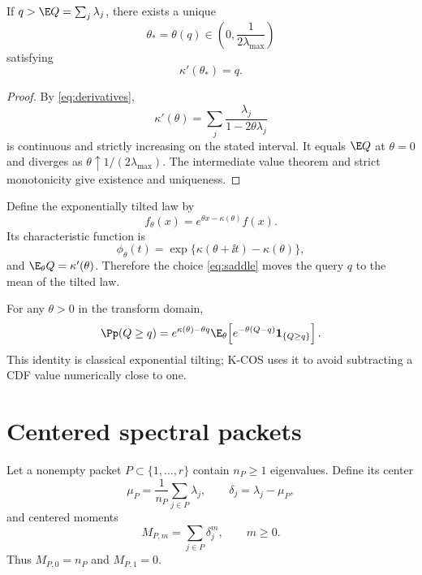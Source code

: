 \begin{theorem}
\label{thm:saddle}
If $q>\E Q=\sum_j\lambda_j$, there exists a unique
\[
\theta_*=\theta(q)\in\left(0,\frac{1}{2\lambda_{\max}}\right)
\]
satisfying
\begin{equation}
\kappa'(\theta_*)=q.
\label{eq:saddle}
\end{equation}
\end{theorem}

\begin{proof}
By \eqref{eq:derivatives},
\[
\kappa'(\theta)=\sum_j\frac{\lambda_j}{1-2\theta\lambda_j}
\]
is continuous and strictly increasing on the stated interval. It equals $\E Q$ at $\theta=0$ and diverges as $\theta\uparrow1/(2\lambda_{\max})$. The intermediate value theorem and strict monotonicity give existence and uniqueness.
\end{proof}

Define the exponentially tilted law by
\begin{equation}
f_{\theta}(x)=e^{\theta x-\kappa(\theta)}f(x).
\label{eq:tilt-density}
\end{equation}
Its characteristic function is
\begin{equation}
\phi_{\theta}(t)
=\exp\{\kappa(\theta+\ii t)-\kappa(\theta)\},
\label{eq:tilt-cf}
\end{equation}
and $\E_{\theta}Q=\kappa'(\theta)$. Therefore the choice \eqref{eq:saddle} moves the query $q$ to the mean of the tilted law.

For any $\theta>0$ in the transform domain,
\begin{equation}
\Pp(Q\ge q)
=e^{\kappa(\theta)-\theta q}
\E_{\theta}\!\left[e^{-\theta(Q-q)}\mathbf 1_{\{Q\ge q\}}\right].
\label{eq:tilt-tail}
\end{equation}
This identity is classical exponential tilting; K-COS uses it to avoid subtracting a CDF value numerically close to one.

\section{Centered spectral packets}

Let a nonempty packet $P\subset\{1,\ldots,r\}$ contain $n_P\ge1$ eigenvalues. Define its center
\[
\mu_P=\frac{1}{n_P}\sum_{j\in P}\lambda_j,
\qquad
\delta_j=\lambda_j-\mu_P,
\]
and centered moments
\begin{equation}
M_{P,m}=\sum_{j\in P}\delta_j^m,
\qquad m\ge0.
\label{eq:centeredmoments}
\end{equation}
Thus $M_{P,0}=n_P$ and $M_{P,1}=0$.

